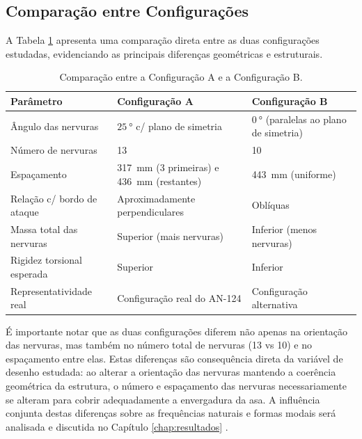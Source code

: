 \documentclass[a4paper,fleqn]{cas-sc}
\begin{document}
\subsection{Comparação entre Configurações}

A Tabela \ref{tab:comparacao_configs} apresenta uma comparação direta entre as duas configurações estudadas, evidenciando as principais diferenças geométricas e estruturais.

\begin{table}
\centering
\caption{Comparação entre a Configuração A e a Configuração B.}
\label{tab:comparacao_configs}
\renewcommand{\arraystretch}{1.4}
\begin{tabularx}{\textwidth}{p{4.5cm} X X}
\toprule
\textbf{Parâmetro} & \textbf{Configuração A} & 
\textbf{Configuração B} \\
\midrule
Ângulo das nervuras         
    & $\qty{25}{\degree}$ c/ plano de simetria    
    & $\qty{0}{\degree}$ (paralelas ao plano de simetria) \\
Número de nervuras          
    & 13                            
    & 10 \\
Espaçamento                 
    & \SI{317}{\milli\meter} (3 primeiras) e \SI{436}{\milli\meter} (restantes)
    & \SI{443}{\milli\meter} (uniforme) \\
Relação c/ bordo de ataque  
    & Aproximadamente perpendiculares   
    & Oblíquas \\
Massa total das nervuras    
    & Superior (mais nervuras)      
    & Inferior (menos nervuras) \\
Rigidez torsional esperada  
    & Superior                      
    & Inferior \\
Representatividade real     
    & Configuração real do AN-124   
    & Configuração alternativa \\
\bottomrule
\end{tabularx}
\end{table}

É importante notar que as duas configurações diferem não apenas na orientação das nervuras, mas também no número total de nervuras (13 vs 10) e no espaçamento entre elas. Estas diferenças são consequência direta da variável de desenho estudada: ao alterar a orientação das nervuras mantendo a coerência geométrica da estrutura, o número e espaçamento das nervuras necessariamente se alteram para cobrir adequadamente a envergadura da asa. A influência conjunta destas diferenças sobre as frequências naturais e formas modais será analisada e discutida no Capítulo \ref{chap:resultados} \cite{Wright2015, Dowell2004}.
\end{document}
